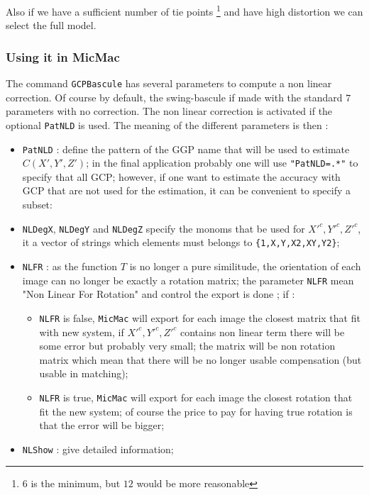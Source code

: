Also if we have a sufficient number of tie points \footnote{$6$ is the minimum, but $12$ would be more
reasonable} and have high distortion we can select the full model.


\subsubsection{Using it in MicMac}

The command {\tt GCPBascule} has several parameters to compute a non linear
correction. Of course by default, the swing-bascule if made with the standard $7$ parameters
with no correction. The non linear correction is activated if the optional {\tt PatNLD} is
used. The meaning of the different parameters is then :


\begin{itemize}
  \item  {\tt PatNLD} :  define the pattern of the GGP name that will be used to estimate  $C(X',Y',Z')$;
         in the final application probably one will use {\tt "PatNLD=.*"} to specify that all GCP; however,
         if one want to estimate the accuracy with GCP that are not used for the estimation, it can be
         convenient to specify a subset:
   \item  {\tt NLDegX}, {\tt NLDegY} and  {\tt NLDegZ} specify the monoms that be used for  $X'^c,Y'^c,Z'^c$,
          it a vector of strings  which elements must belongs to {\tt \{1,X,Y,X2,XY,Y2\}};
   \item  {\tt NLFR}  : as the function $T$ is no longer a pure similitude, the orientation of each image
          can no longer be exactly a rotation matrix; the parameter {\tt NLFR} mean "Non Linear For Rotation" and
          control the export is done ; if :

\begin{itemize}
     \item   {\tt NLFR} is false, {\tt MicMac} will export for each image the closest matrix that fit
             with new system, if $X'^c,Y'^c,Z'^c$ contains non linear term there will be some error but
             probably very small; the matrix will be non rotation matrix which mean that there will be
             no longer usable compensation (but usable in matching);

     \item   {\tt NLFR} is true, {\tt MicMac} will export for each image the closest rotation that fit
             the new system; of course the price to pay for having true rotation is that the error will be bigger;

\end{itemize}

   \item  {\tt NLShow}  : give detailed information;
\end{itemize}




